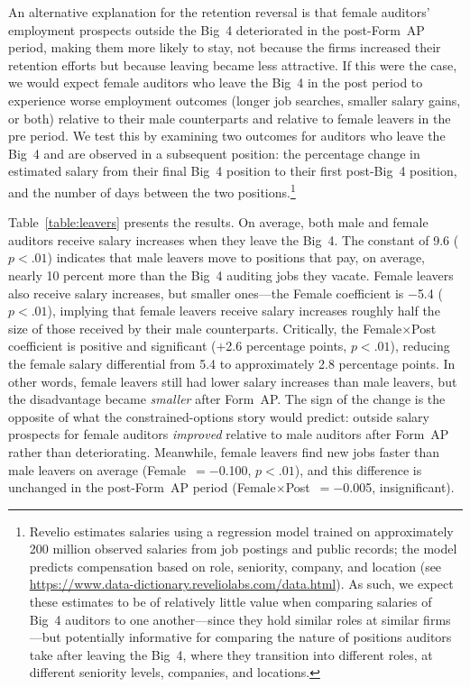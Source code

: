 \documentclass[11pt]{article}
\begin{document}
        An alternative explanation for the retention reversal is that female auditors' employment prospects outside the Big~4 deteriorated in the post-Form~AP period, making them more likely to stay, not because the firms increased their retention efforts but because leaving became less attractive. If this were the case, we would expect female auditors who leave the Big~4 in the post period to experience worse employment outcomes (longer job searches, smaller salary gains, or both) relative to their male counterparts and relative to female leavers in the pre period. We test this by examining two outcomes for auditors who leave the Big~4 and are observed in a subsequent position: the percentage change in estimated salary from their final Big~4 position to their first post-Big~4 position, and the number of days between the two positions.\footnote{Revelio estimates salaries using a regression model trained on approximately 200 million observed salaries from job postings and public records; the model predicts compensation based on role, seniority, company, and location (see \url{https://www.data-dictionary.reveliolabs.com/data.html}). As such, we expect these estimates to be of relatively little value when comparing salaries of Big~4 auditors to one another---since they hold similar roles at similar firms---but potentially informative for comparing the nature of positions auditors take after leaving the Big~4, where they transition into different roles, at different seniority levels, companies, and locations.}

        Table~\ref{table:leavers} presents the results. On average, both male and female auditors receive salary increases when they leave the Big~4. The constant of 9.6 ($p<.01$) indicates that male leavers move to positions that pay, on average, nearly 10 percent more than the Big~4 auditing jobs they vacate. Female leavers also receive salary increases, but smaller ones---the Female coefficient is $-$5.4 ($p<.01$), implying that female leavers receive salary increases roughly half the size of those received by their male counterparts. Critically, the Female$\times$Post coefficient is positive and significant ($+$2.6 percentage points, $p<.01$), reducing the female salary differential from 5.4 to approximately 2.8 percentage points. In other words, female leavers still had lower salary increases than male leavers, but the disadvantage became \textit{smaller} after Form~AP. The sign of the change is the opposite of what the constrained-options story would predict: outside salary prospects for female auditors \textit{improved} relative to male auditors after Form~AP rather than deteriorating. Meanwhile, female leavers find new jobs faster than male leavers on average (Female~$= -$0.100, $p<.01$), and this difference is unchanged in the post-Form~AP period (Female$\times$Post~$= -$0.005, insignificant).
\end{document}
